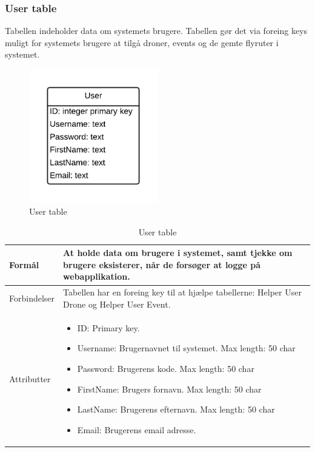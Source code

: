 \subsubsection*{User table}
Tabellen indeholder data om systemets brugere. Tabellen gør det via foreing keys muligt for systemets brugere at tilgå droner, events og de gemte flyruter i systemet.
\vspace{-5pt}
\begin{figure}[H]
	\centering
	\includegraphics[width=0.5\textwidth]{Billeder/database/UserTabel.png}
	\vspace{-5pt}
	\caption{User table}
	\label{fig:user_table}
\end{figure}

\begin{table}[H]
\begin{tabular}{| p{3cm}| p{11.5cm}|}
\hline

Formål	 							& At holde data om brugere i systemet, samt tjekke om brugere eksisterer, når de forsøger at logge på webapplikation.\\\hline
Forbindelser						& Tabellen har en foreing key til at hjælpe tabellerne: Helper User Drone og Helper User Event.\\\hline
Attributter						& \begin{itemize}
												\item ID: Primary key.
												\item Username: Brugernavnet til systemet. Max length: 50 char
												\item Password: Brugerens kode. Max length: 50 char
												\item FirstName: Brugers fornavn. Max length: 50 char
												\item LastName: Brugerens efternavn. Max length: 50 char
												\item Email: Brugerens email adresse.
											\end{itemize} \\\hline 
\end{tabular}
\caption{User table}
\label{tab:user_table}
\end{table}